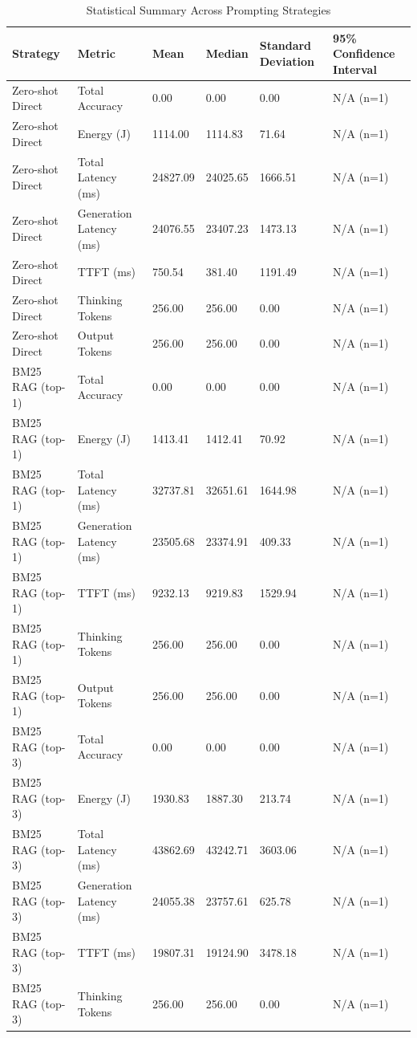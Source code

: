 \begin{table}
\caption{Statistical Summary Across Prompting Strategies}
\label{tab:statistical_summary}
\begin{tabular}{llllll}
\toprule
Strategy & Metric & Mean & Median & Standard Deviation & 95\% Confidence Interval \\
\midrule
Zero-shot Direct & Total Accuracy & 0.00 & 0.00 & 0.00 & N/A (n=1) \\
Zero-shot Direct & Energy (J) & 1114.00 & 1114.83 & 71.64 & N/A (n=1) \\
Zero-shot Direct & Total Latency (ms) & 24827.09 & 24025.65 & 1666.51 & N/A (n=1) \\
Zero-shot Direct & Generation Latency (ms) & 24076.55 & 23407.23 & 1473.13 & N/A (n=1) \\
Zero-shot Direct & TTFT (ms) & 750.54 & 381.40 & 1191.49 & N/A (n=1) \\
Zero-shot Direct & Thinking Tokens & 256.00 & 256.00 & 0.00 & N/A (n=1) \\
Zero-shot Direct & Output Tokens & 256.00 & 256.00 & 0.00 & N/A (n=1) \\
BM25 RAG (top-1) & Total Accuracy & 0.00 & 0.00 & 0.00 & N/A (n=1) \\
BM25 RAG (top-1) & Energy (J) & 1413.41 & 1412.41 & 70.92 & N/A (n=1) \\
BM25 RAG (top-1) & Total Latency (ms) & 32737.81 & 32651.61 & 1644.98 & N/A (n=1) \\
BM25 RAG (top-1) & Generation Latency (ms) & 23505.68 & 23374.91 & 409.33 & N/A (n=1) \\
BM25 RAG (top-1) & TTFT (ms) & 9232.13 & 9219.83 & 1529.94 & N/A (n=1) \\
BM25 RAG (top-1) & Thinking Tokens & 256.00 & 256.00 & 0.00 & N/A (n=1) \\
BM25 RAG (top-1) & Output Tokens & 256.00 & 256.00 & 0.00 & N/A (n=1) \\
BM25 RAG (top-3) & Total Accuracy & 0.00 & 0.00 & 0.00 & N/A (n=1) \\
BM25 RAG (top-3) & Energy (J) & 1930.83 & 1887.30 & 213.74 & N/A (n=1) \\
BM25 RAG (top-3) & Total Latency (ms) & 43862.69 & 43242.71 & 3603.06 & N/A (n=1) \\
BM25 RAG (top-3) & Generation Latency (ms) & 24055.38 & 23757.61 & 625.78 & N/A (n=1) \\
BM25 RAG (top-3) & TTFT (ms) & 19807.31 & 19124.90 & 3478.18 & N/A (n=1) \\
BM25 RAG (top-3) & Thinking Tokens & 256.00 & 256.00 & 0.00 & N/A (n=1) \\

\end{tabular}
\end{table}

